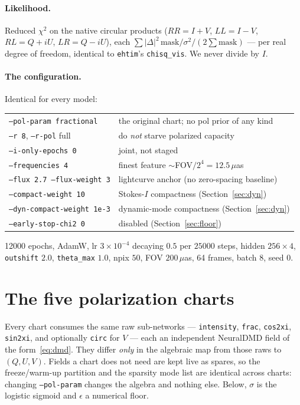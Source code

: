 \documentclass[11pt]{article}
\begin{document}
\paragraph{Likelihood.} Reduced $\chi^2$ on the native circular products
($RR=I+V$, $LL=I-V$, $RL=Q+iU$, $LR=Q-iU$), each
$\sum|\Delta|^2\,\mathrm{mask}/\sigma^2/(2\sum\mathrm{mask})$ --- per real degree of
freedom, identical to \texttt{ehtim}'s \texttt{chisq\_vis}. We never divide by $I$.

\paragraph{The configuration.} Identical for every model:
\begin{center}
\begin{tabular}{@{}ll@{}}
\toprule
\texttt{--pol-param fractional}      & the original chart; no pol prior of any kind \\
\texttt{--r 8}, \texttt{--r-pol} full & do \emph{not} starve polarized capacity \\
\texttt{--i-only-epochs 0}           & joint, not staged \\
\texttt{--frequencies 4}             & finest feature ${\sim}$FOV$/2^4=12.5\,\mu$as \\
\texttt{--flux 2.7 --flux-weight 3}  & lightcurve anchor (no zero-spacing baseline) \\
\texttt{--compact-weight 10}         & Stokes-$I$ compactness (Section~\ref{sec:dyn}) \\
\texttt{--dyn-compact-weight 1e-3}   & dynamic-mode compactness (Section~\ref{sec:dyn}) \\
\texttt{--early-stop-chi2 0}         & disabled (Section~\ref{sec:floor}) \\
\bottomrule
\end{tabular}
\end{center}
12000 epochs, AdamW, lr $3\times10^{-4}$ decaying $0.5$ per $25000$ steps, hidden
$256\times4$, \texttt{outshift} $2.0$, \texttt{theta\_max} $1.0$, npix $50$,
FOV $200\,\mu$as, 64 frames, batch 8, seed 0.

\section{The five polarization charts}
\label{sec:charts}

Every chart consumes the same raw sub-networks --- \texttt{intensity}, \texttt{frac},
\texttt{cos2xi}, \texttt{sin2xi}, and optionally \texttt{circ} for $V$ --- each an
independent NeuralDMD field of the form~\eqref{eq:dmd}. They differ \emph{only} in the
algebraic map from those raws to $(Q,U,V)$. Fields a chart does not need are kept live as
spares, so the freeze/warm-up partition and the sparsity mode list are identical across
charts: changing \texttt{--pol-param} changes the algebra and nothing else. Below,
$\sigma$ is the logistic sigmoid and $\epsilon$ a numerical floor.
\end{document}
